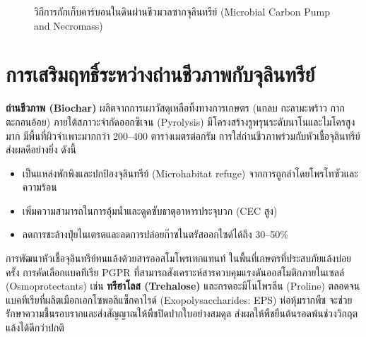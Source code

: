 \begin{figure}[H]
\caption{วิถีการกักเก็บคาร์บอนในดินผ่านชีวมวลซากจุลินทรีย์ (Microbial Carbon Pump and Necromass)}
\label{fig:carbon_pump}
\end{figure}

\section{การเสริมฤทธิ์ระหว่างถ่านชีวภาพกับจุลินทรีย์}

\textbf{ถ่านชีวภาพ (Biochar)} ผลิตจากการเผาวัสดุเหลือทิ้งทางการเกษตร (แกลบ กะลามะพร้าว กากตะกอนอ้อย) ภายใต้สภาวะจำกัดออกซิเจน (Pyrolysis) มีโครงสร้างรูพรุนระดับนาโนและไมโครสูงมาก มีพื้นที่ผิวจำเพาะมากกว่า 200--400 ตารางเมตรต่อกรัม การใส่ถ่านชีวภาพร่วมกับหัวเชื้อจุลินทรีย์ส่งผลดีอย่างยิ่ง ดังนี้
\begin{itemize}
    \item เป็นแหล่งพักพิงและปกป้องจุลินทรีย์ (Microhabitat refuge) จากการถูกล่าโดยโพรโทซัวและความร้อน
    \item เพิ่มความสามารถในการอุ้มน้ำและดูดซับธาตุอาหารประจุบวก (CEC สูง)
    \item ลดการชะล้างปุ๋ยไนเตรตและลดการปล่อยก๊าซไนตรัสออกไซด์ได้ถึง 30--50\%
\end{itemize}

\begin{agribox}{การพัฒนาหัวเชื้อจุลินทรีย์ทนแล้งด้วยสารออสโมโพรเทกแทนท์}
ในพื้นที่เกษตรที่ประสบภัยแล้งบ่อยครั้ง การคัดเลือกแบคทีเรีย PGPR ที่สามารถสังเคราะห์สารควบคุมแรงดันออสโมติกภายในเซลล์ (Osmoprotectants) เช่น \textbf{ทรีฮาโลส (Trehalose)} และกรดอะมิโนโพรลีน (Proline) ตลอดจนแบคทีเรียที่ผลิตเมือกเอกโซพอลิแซ็กคาไรด์ (Exopolysaccharides: EPS) ห่อหุ้มรากพืช จะช่วยรักษาความชื้นรอบรากและส่งสัญญาณให้พืชปิดปากใบอย่างสมดุล ส่งผลให้พืชยืนต้นรอดพ้นช่วงวิกฤตแล้งได้ดีกว่าปกติ
\end{agribox}

